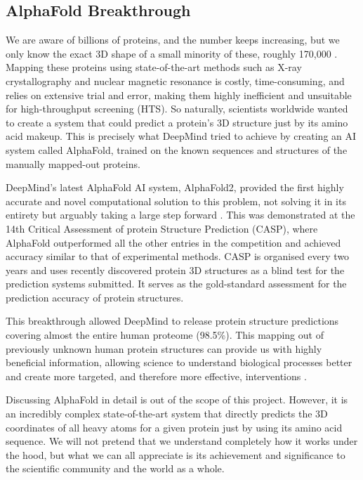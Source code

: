 \subsection{AlphaFold Breakthrough}

We are aware of billions of proteins, and the number keeps increasing, but we only know the exact 3D shape of a small minority of these, roughly 170,000 \citep{Jumper2021}. Mapping these proteins using state-of-the-art methods such as X-ray crystallography and nuclear magnetic resonance is costly, time-consuming, and relies on extensive trial and error, making them highly inefficient and unsuitable for high-throughput screening (HTS). So naturally, scientists worldwide wanted to create a system that could predict a protein's 3D structure just by its amino acid makeup. This is precisely what DeepMind tried to achieve by creating an AI system called AlphaFold, trained on the known sequences and structures of the manually mapped-out proteins.

DeepMind's latest AlphaFold AI system, AlphaFold2, provided the first highly accurate and novel computational solution to this problem, not solving it in its entirety but arguably taking a large step forward \citep{Jumper2021}. This was demonstrated at the 14th Critical Assessment of protein Structure Prediction (CASP), where AlphaFold outperformed all the other entries in the competition and achieved accuracy similar to that of experimental methods. CASP is organised every two years and uses recently discovered protein 3D structures as a blind test for the prediction systems submitted. It serves as the gold-standard assessment for the prediction accuracy of protein structures.

This breakthrough allowed DeepMind to release protein structure predictions covering almost the entire human proteome (98.5\%). This mapping out of previously unknown human protein structures can provide us with highly beneficial information, allowing science to understand biological processes better and create more targeted, and therefore more effective, interventions \citep{Tunyasuvunakool2021}. 

Discussing AlphaFold in detail is out of the scope of this project. However, it is an incredibly complex state-of-the-art system that directly predicts the 3D coordinates of all heavy atoms for a given protein just by using its amino acid sequence. We will not pretend that we understand completely how it works under the hood, but what we can all appreciate is its achievement and significance to the scientific community and the world as a whole.

